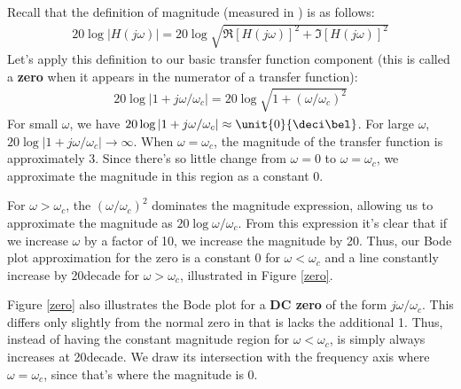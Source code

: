 \documentclass{article}
\begin{document}
Recall that the definition of magnitude (measured in \deci\bel) is as follows:
\begin{align*}
  20\log\left|H(j\omega)\right| = 20\log\sqrt{\Re{\left[H(j\omega)\right]}^2 + \Im{\left[H(j\omega)\right]}^2}
\end{align*}
Let's apply this definition to our basic transfer function component (this is called a \textbf{zero} when it appears in the numerator of a transfer function):
\begin{align*}
  20\log \left|1 + j\omega/\omega_c\right| = 20\log \sqrt{1 + \left(\omega/\omega_c\right)^2}
\end{align*}
For small $\omega$, we have $20\log \left|1 + j\omega/\omega_c\right| \approx \unit{0}{\deci\bel}$. For large $\omega$, $20\log \left|1 + j\omega/\omega_c\right| \rightarrow \infty$. When $\omega = \omega_c$, the magnitude of the transfer function is approximately \unit{3}{\deci\bel}. Since there's so little change from $\omega=0$ to $\omega=\omega_c$, we approximate the magnitude in this region as a constant \unit{0}{\deci\bel}.

For $\omega > \omega_c$, the $\left(\omega/\omega_c\right)^2$ dominates the magnitude expression, allowing us to approximate the magnitude as $20\log{\omega/\omega_c}$. From this expression it's clear that if we increase $\omega$ by a factor of 10, we increase the magnitude by \unit{20}{\deci\bel}. Thus, our Bode plot approximation for the zero is a constant \unit{0}{\deci\bel} for $\omega < \omega_c$ and a line constantly increase by \unit{20}{\deci\bel\per decade} for $\omega > \omega_c$, illustrated in Figure \ref{zero}.

Figure \ref{zero} also illustrates the Bode plot for a \textbf{DC zero} of the form $j\omega/\omega_c$. This differs only slightly from the normal zero in that is lacks the additional 1. Thus, instead of having the constant magnitude region for $\omega < \omega_c$, is simply always increases at \unit{20}{\deci\bel\per decade}. We draw its intersection with the frequency axis where $\omega = \omega_c$, since that's where the magnitude is \unit{0}{\deci\bel}.
\end{document}
